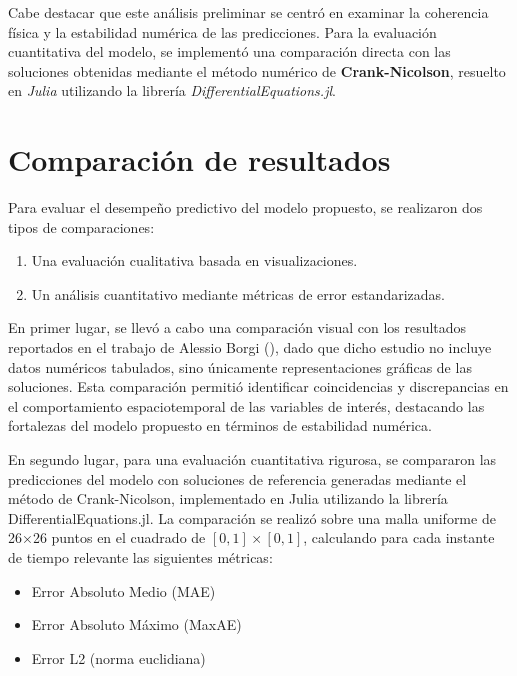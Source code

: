 \documentclass[
  spanish,
  us-letterpaper,
  DIV=11,
  numbers=noendperiod]{scrreprt}
\providecommand{\tightlist}{%
  \setlength{\itemsep}{0pt}\setlength{\parskip}{0pt}}
\theoremstyle{plain}
\theoremstyle{definition}
\theoremstyle{remark}
\begin{document}
Cabe destacar que este análisis preliminar se centró en examinar la
coherencia física y la estabilidad numérica de las predicciones. Para la
evaluación cuantitativa del modelo, se implementó una comparación
directa con las soluciones obtenidas mediante el método numérico de
\textbf{Crank-Nicolson}, resuelto en \emph{Julia} utilizando la librería
\emph{DifferentialEquations.jl}.

\section{Comparación de resultados}\label{comparaciuxf3n-de-resultados}

Para evaluar el desempeño predictivo del modelo propuesto, se realizaron
dos tipos de comparaciones:

\begin{enumerate}
\def\labelenumi{\arabic{enumi}.}
\tightlist
\item
  Una evaluación cualitativa basada en visualizaciones.
\item
  Un análisis cuantitativo mediante métricas de error estandarizadas.
\end{enumerate}

En primer lugar, se llevó a cabo una comparación visual con los
resultados reportados en el trabajo de Alessio Borgi
(), dado que dicho estudio no incluye
datos numéricos tabulados, sino únicamente representaciones gráficas de
las soluciones. Esta comparación permitió identificar coincidencias y
discrepancias en el comportamiento espaciotemporal de las variables de
interés, destacando las fortalezas del modelo propuesto en términos de
estabilidad numérica.

En segundo lugar, para una evaluación cuantitativa rigurosa, se
compararon las predicciones del modelo con soluciones de referencia
generadas mediante el método de Crank-Nicolson, implementado en Julia
utilizando la librería DifferentialEquations.jl. La comparación se
realizó sobre una malla uniforme de 26×26 puntos en el cuadrado de
\([0,1]\times[0,1]\), calculando para cada instante de tiempo relevante
las siguientes métricas:

\begin{itemize}
\tightlist
\item
  Error Absoluto Medio (MAE)
\item
  Error Absoluto Máximo (MaxAE)
\item
  Error L2 (norma euclidiana)
\end{itemize}
\end{document}
